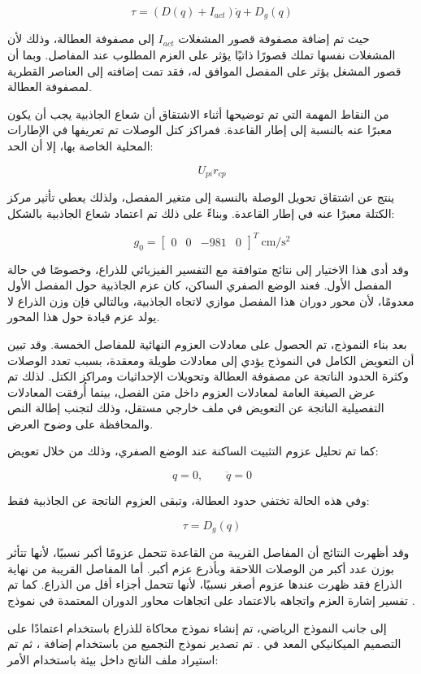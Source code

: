 \[
\tau =
\left(D(q)+I_{act}\right)\ddot{q}
+
D_g(q)
\]

حيث تم إضافة مصفوفة قصور المشغلات \(I_{act}\) إلى مصفوفة العطالة، وذلك لأن المشغلات نفسها تملك قصورًا ذاتيًا يؤثر على العزم المطلوب عند المفاصل. وبما أن قصور المشغل يؤثر على المفصل الموافق له، فقد تمت إضافته إلى العناصر القطرية لمصفوفة العطالة.

من النقاط المهمة التي تم توضيحها أثناء الاشتقاق أن شعاع الجاذبية يجب أن يكون معبرًا عنه بالنسبة إلى إطار القاعدة. فمراكز كتل الوصلات تم تعريفها في الإطارات المحلية الخاصة بها، إلا أن الحد:

\[
U_{pi}r_{cp}
\]

ينتج عن اشتقاق تحويل الوصلة بالنسبة إلى متغير المفصل، ولذلك يعطي تأثير مركز الكتلة معبرًا عنه في إطار القاعدة. وبناءً على ذلك تم اعتماد شعاع الجاذبية بالشكل:

\[
g_0 =
\begin{bmatrix}
0 & 0 & -981 & 0
\end{bmatrix}^{T}
\ \mathrm{cm/s^2}
\]

وقد أدى هذا الاختيار إلى نتائج متوافقة مع التفسير الفيزيائي للذراع، وخصوصًا في حالة المفصل الأول. فعند الوضع الصفري الساكن، كان عزم الجاذبية حول المفصل الأول معدومًا، لأن محور دوران هذا المفصل موازي لاتجاه الجاذبية، وبالتالي فإن وزن الذراع لا يولد عزم قيادة حول هذا المحور.

بعد بناء النموذج، تم الحصول على معادلات العزوم النهائية للمفاصل الخمسة. وقد تبين أن التعويض الكامل في النموذج يؤدي إلى معادلات طويلة ومعقدة، بسبب تعدد الوصلات وكثرة الحدود الناتجة عن مصفوفة العطالة وتحويلات الإحداثيات ومراكز الكتل. لذلك تم عرض الصيغة العامة لمعادلات العزوم داخل متن الفصل، بينما أُرفقت المعادلات التفصيلية الناتجة عن التعويض في ملف خارجي مستقل، وذلك لتجنب إطالة النص والمحافظة على وضوح العرض.

كما تم تحليل عزوم التثبيت الساكنة عند الوضع الصفري، وذلك من خلال تعويض:

\[
q=0,
\qquad
\ddot{q}=0
\]

وفي هذه الحالة تختفي حدود العطالة، وتبقى العزوم الناتجة عن الجاذبية فقط:

\[
\tau = D_g(q)
\]

وقد أظهرت النتائج أن المفاصل القريبة من القاعدة تتحمل عزومًا أكبر نسبيًا، لأنها تتأثر بوزن عدد أكبر من الوصلات اللاحقة وبأذرع عزم أكبر. أما المفاصل القريبة من نهاية الذراع فقد ظهرت عندها عزوم أصغر نسبيًا، لأنها تتحمل أجزاء أقل من الذراع. كما تم تفسير إشارة العزم واتجاهه بالاعتماد على اتجاهات محاور الدوران المعتمدة في نموذج .

إلى جانب النموذج الرياضي، تم إنشاء نموذج محاكاة للذراع باستخدام   اعتمادًا على التصميم الميكانيكي المعد في . تم تصدير نموذج التجميع من  باستخدام إضافة   ، ثم تم استيراد ملف  الناتج داخل بيئة  باستخدام الأمر:

